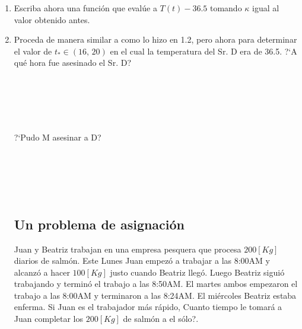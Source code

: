 \documentclass[letter,11pt]{article}
\newcommand\0{\mathbf{0}}
\begin{document}
\begin{enumerate}
\begin{enumerate}
						\medskip


\textbf{Nota 2:} Si tiene una funci\'on con muchas entradas pero solo una de ellas es una variable, puede utilizar \verb"fzero" con el comando \verb"@(x)". Por ejemplo.

						\medskip
							
						\begin{Verbatim}[gobble=6,frame=single,numbers=left]
						f=inline('x.^2-y.^2');

						xo=fzero(@(x)f(x,4),1.5)
						yo=fzero(@(y)f(4,y),1.5)
						\end{Verbatim}
						
						\medskip



				\end{enumerate}

			\item Escriba ahora una funci\'on que eval\'ue a $T(t)-36.5$ tomando $\kappa$ igual
				al valor obtenido antes.


			\item Proceda de manera similar a como lo hizo en 1.2, pero ahora para determinar
				el valor de $t_* \in (16,\,20)$ en el cual la temperatura del Sr. D era de
				36.5. ?`A qu\'e hora fue asesinado el Sr. D?
				
					\medskip
							
					\begin{Verbatim}[gobble=6,frame=single]
					
					
					
					
					\end{Verbatim}
					
					\medskip
				
					\noindent ?`Pudo M asesinar a D?
				
					\medskip
							
					\begin{Verbatim}[gobble=6,frame=single]
					
					
					
					
					\end{Verbatim}
					
					\medskip

\subsection{Un problema de asignaci\'on}

Juan y Beatriz trabajan en una empresa pesquera que procesa $200[Kg]$ diarios de salm\'on. Este Lunes Juan empez\'o a trabajar a las 8:00AM y alcanz\'o a hacer $100[Kg]$ justo cuando Beatriz lleg\'o. Luego Beatriz sigui\'o trabajando y termin\'o el trabajo a las 8:50AM. El martes ambos empezaron el trabajo a las 8:00AM y terminaron a las 8:24AM. El mi\'ercoles Beatriz estaba enferma. Si Juan es el trabajador m\'as r\'apido, \textquestiondown Cuanto tiempo le tomar\'a a Juan completar los $200[Kg]$ de salm\'on a el s\'olo?.


\end{enumerate}
\end{document}
